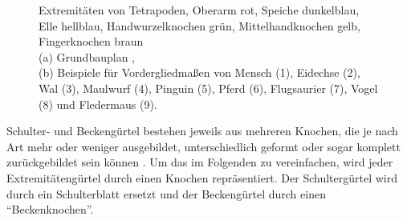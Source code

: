  \begin{figure}
   \label{grundbauplan}
  \qquad
   \label{bsp_extremitaeten}
  
  \caption{Extremitäten von Tetrapoden, Oberarm rot, Speiche dunkelblau, Elle hellblau, Handwurzelknochen grün, Mittelhandknochen gelb, Fingerknochen braun\\
  (a) Grundbauplan \cite[S.\ 487, vereinfacht und eingefärbt]{AllgemeineZoologie},\\
  (b) Beispiele für Vordergliedmaßen von Mensch (1), Eidechse (2), Wal (3), Maulwurf (4), Pinguin (5), Pferd (6), Flugsaurier (7), Vogel (8) und Fledermaus (9). \mbox{\cite[S.\ 474]{dtvBiologie}}}
  \label{extremities}
 \end{figure}

Schulter- und Beckengürtel bestehen  jeweils aus mehreren Knochen, die je nach Art mehr oder weniger ausgebildet, unterschiedlich geformt oder sogar komplett zurückgebildet sein können \cite[Absatz 9.7]{Vergleichende_Anatomie}. Um das im Folgenden zu vereinfachen, wird jeder Extremitätengürtel durch einen Knochen repräsentiert. Der Schultergürtel wird durch ein Schulterblatt ersetzt und der Beckengürtel durch einen "`Beckenknochen"'.

